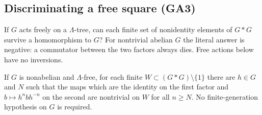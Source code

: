 \subsection{Discriminating a free square (GA3)}\label{sec:ga3}
If $G$ acts freely on a $\Lambda$-tree, can each finite set of
nonidentity elements of $G*G$ survive a homomorphism to $G$?
For nontrivial abelian $G$ the literal answer is negative: a commutator
between the two factors always dies. Free actions below have no inversions.

\begin{theorem}\label{prop:ga3}
If $G$ is nonabelian and $\Lambda$-free, for each finite
$W\subset(G*G)\setminus\{1\}$ there are $h\in G$ and $N$ such
that the maps which are the identity on the first factor and
$b\mapsto h^nbh^{-n}$ on the second are nontrivial on $W$ for all
$n\ge N$. No finite-generation hypothesis on $G$ is required.
\end{theorem}
